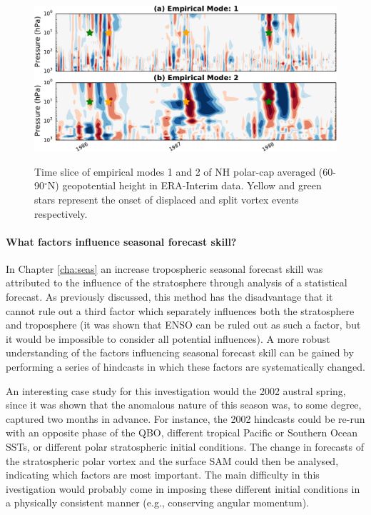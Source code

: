 \begin{figure}[t]
  \centering
  \noindent\includegraphics[width=\textwidth,angle=0]{figures/chapter-conclusions/EMD2.pdf}\\
  \caption[EMD timeseries]{Time slice of empirical modes 1 and 2 of NH polar-cap
    averaged (60-90$^{\circ}$N) geopotential height in ERA-Interim data. Yellow
    and green stars represent the onset of displaced and split vortex events
    respectively.}\label{fig:emd}
\end{figure}


\paragraph{What factors influence seasonal forecast skill?} In Chapter
\ref{cha:seas} an increase tropospheric seasonal forecast skill was attributed
to the influence of the stratosphere through analysis of a statistical
forecast. As previously discussed, this method has the disadvantage that it
cannot rule out a third factor which separately influences both the stratosphere
and troposphere (it was shown that ENSO can be ruled out as such a factor, but
it would be impossible to consider all potential influences). A more robust
understanding of the factors influencing seasonal forecast skill can be gained
by performing a series of hindcasts in which these factors are systematically
changed.

An interesting case study for this investigation would the 2002 austral spring,
since it was shown that the anomalous nature of this season was, to some degree,
captured two months in advance. For instance, the 2002 hindcasts could be re-run
with an opposite phase of the QBO, different tropical Pacific or Southern Ocean
SSTs, or different polar stratospheric initial conditions. The change in
forecasts of the stratospheric polar vortex and the surface SAM could then be
analysed, indicating which factors are most important. The main difficulty in
this ivestigation would probably come in imposing these different initial
conditions in a physically consistent manner (e.g., conserving angular
momentum).

